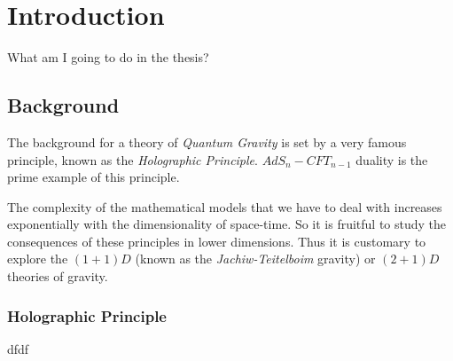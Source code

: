 
\chapter{Introduction} %

\label{Chapter1}



What am I going to do in the thesis?

\section{Background}

The background for a theory of \textit{Quantum Gravity} is set by a very famous principle, known as the \textit{Holographic Principle}. $AdS_n-CFT_{n-1}$ duality is the prime example of this principle. 

The complexity of the mathematical models that we have to deal with increases exponentially with the dimensionality of space-time. So it is fruitful to study the consequences of these principles in lower dimensions. Thus it is customary to explore the $(1+1)D$ (known as the \textit{Jachiw-Teitelboim} gravity) or $(2+1)D$ theories of gravity.  


\subsection{Holographic Principle}
dfdf

